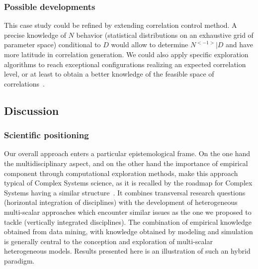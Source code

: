 



\subsubsection{Possible developments}


This case study could be refined by extending correlation control method. A precise knowledge of $N$ behavior (statistical distributions on an exhaustive grid of parameter space) conditional to $D$ would allow to determine $N^{<-1>} | D$ and have more latitude in correlation generation. We could also apply specific exploration algorithms to reach exceptional configurations realizing an expected correlation level, or at least to obtain a better knowledge of the feasible space of correlations~\cite{10.1371/journal.pone.0138212}.




\subsection{Discussion}



\subsubsection*{Scientific positioning}


Our overall approach enters a particular epistemological frame. On the one hand the multidisciplinary aspect, and on the other hand the importance of empirical component through computational exploration methods, make this approach typical of Complex Systems science, as it is recalled by the roadmap for Complex Systems having a similar structure~\cite{2009arXiv0907.2221B}. It combines transversal research questions (horizontal integration of disciplines) with the development of heterogeneous multi-scalar approaches which encounter similar issues as the one we proposed to tackle (vertically integrated disciplines). The combination of empirical knowledge obtained from data mining, with knowledge obtained by modeling and simulation is generally central to the conception and exploration of multi-scalar heterogeneous models. Results presented here is an illustration of such an hybrid paradigm.




